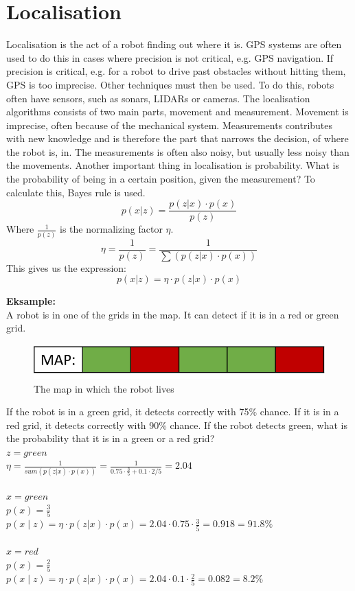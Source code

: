 \section{Localisation}
Localisation is the act of a robot finding out where it is. GPS systems are often used to do this in cases where precision is not critical, e.g. GPS navigation. If precision is critical, e.g. for a robot to drive past obstacles without hitting them, GPS is too imprecise. Other techniques must then be used. To do this, robots often have sensors, such as sonars, LIDARs or cameras. 
The localisation algorithms consists of two main parts, movement and measurement. Movement is imprecise, often because of the mechanical system. Measurements contributes with new knowledge and is therefore the part that narrows the decision, of where the robot is, in. The measurements is often also noisy, but usually less noisy than the movements.
Another important thing in localisation is probability. What is the probability of being in a certain position, given the measurement? To calculate this, Bayes rule is used.
\begin{equation}
p(x|z) = \frac{p(z|x)\cdot p(x)}{p(z)}
\end{equation}
Where $\frac{1}{p(z)}$ is the normalizing factor $\eta$.
\begin{equation}
\eta = \frac{1}{p(z)} = \frac{1}{\sum(p(z|x)\cdot p(x))}
\end{equation}
This gives us the expression:
\begin{equation}
p(x|z) = \eta \cdot p(z|x)\cdot p(x)
\end{equation}

\textbf{Eksample:}\\
A robot is in one of the grids in the map. It can detect if it is in a red or green grid. 
\begin{figure}[H]
\includegraphics[scale=1]{billeder/Localisation01.png}
\caption{The map in which the robot lives}
\end{figure}
If the robot is in a green grid, it detects correctly with 75\% chance. If it is in a red grid, it detects correctly with 90\% chance.
If the robot detects green, what is the probability that it is in a green or a red grid?\\
$z = green$\\
$\eta = \frac{1}{sum(p(z|x)\cdot p(x))} = \frac{1}{0.75 \cdot \frac{3}{5} + 0.1 \cdot 2/5} = 2.04$\\\\
$x = green$\\
$p(x) = \frac{3}{5}$\\
$p(x \mid z) = \eta \cdot p(z|x)\cdot p(x) = 2.04 \cdot 0.75 \cdot \frac{3}{5} = 0.918 = 91.8\%$\\\\
$x = red$\\
$p(x) = \frac{2}{5}$\\
$p(x \mid z) = \eta \cdot p(z|x)\cdot p(x) = 2.04 \cdot 0.1 \cdot \frac{2}{5} = 0.082 = 8.2\%$

